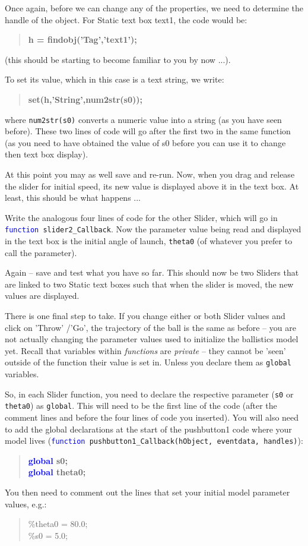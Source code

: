 \documentclass{tufte-book} %
\newenvironment{docspec}{\begin{quotation}\ttfamily\parskip0pt\parindent0pt\ignorespaces}{\end{quotation}}
\newenvironment{docspecbold}{\begin{quotation}\ttfamily\bfseries\parskip0pt\parindent0pt\ignorespaces}{\end{quotation}}
\begin{document}
Once again, before we can change any of the properties, we need to determine the handle of the object. For \textsf{Static text} box \textsf{text1}, the code would be:
\begin{docspecbold}
h = findobj(\textcolor[rgb]{0.501961,0,1}{'Tag'},\textcolor[rgb]{0.501961,0,1}{'text1'});
\end{docspecbold}
(this should be starting to become familiar to you by now ...).

To set its value, which in this case is a text string, we write:
\begin{docspecbold}
set(h,\textcolor[rgb]{0.501961,0,1}{'String'},num2str(s0));
\end{docspecbold}
where \texttt{num2str(s0)} converts a numeric value into a string (as you have seen before). These two lines of code will go after the first two in the same function (as you need to have obtained the value of s0 before you can use it to change then text box display).

At this point you may as well save and re-run. Now, when you drag and release the slider for initial speed, its new value is displayed above it in the text box. At least, this should be what happens ...

Write the analogous four lines of code for the other Slider, which will go in \texttt{\textcolor{blue}{function} slider2\_Callback}. Now the parameter value being read and displayed in the text box is the initial angle of launch, \texttt{theta0} (of whatever you prefer to call the parameter).

Again -- save and test what you have so far. This should now be two \textsf{Sliders} that are linked to two \textsf{Static text} boxes such that when the slider is moved, the new values are displayed. 

There is one final step to take. If you change either or both \textsf{Slider} values and click on 'Throw' /'Go', the trajectory of the ball is the same as before -- you are not actually changing the parameter values used to initialize the ballistics model yet. Recall that variables within \textit{functions} are \textit{private} -- they cannot be 'seen' outside of the function their value is set in. Unless you declare them as \texttt{global} variables.

So, in each \textsf{Slider} function, you need to declare the respective parameter (\texttt{s0} or \texttt{theta0}) as \texttt{global}. This will need to be the first line of the code (after the comment lines and before the four lines of code you inserted). You will also need to add the global declarations at the start of the \textsf{pushbutton1} code where your model lives (\texttt{\textcolor{blue}{function} pushbutton1\_Callback(hObject, eventdata, handles)}):
\begin{docspecbold}
\textcolor{blue}{global} s0;
\\\textcolor{blue}{global} theta0;
\end{docspecbold}
You then need to comment out the lines that set your initial model parameter values, e.g.:
\begin{docspec}
\textcolor[rgb]{0,0.501961,0}{\%theta0 = 80.0;
\\\%s0 = 5.0;}
\end{docspec}
\end{document}
